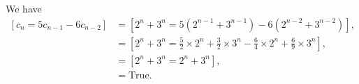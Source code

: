 \documentclass[12pt,fleqn,answers]{exam}
\begin{document}
\begin{questions}
\begin{solution}[2.5in] We have
\begin{align*}
  \left[ c_n = 5 c_{n-1}-6 c_{n-2} \right] &= \left[  2^n +3^n = 5 ( 2^{n-1} +3^{n-1}) - 6 (  2^{n-2} +3^{n-2} ) \right], \\
                                                                      &=  \left[  2^n +3^n = \frac{5}{2}  \times  2^{n} + \frac{3}{2} \times 3^{n} - \frac{6}{4}   \times 2^n + \frac{6}{9} \times 3^n \right],\\
              &=\left[  2^n +3^n = 2^n +3^n     \right], \\
              &= \text{True}.                                                    
\end{align*}
\end{solution}

  \end{questions}
\end{document}
